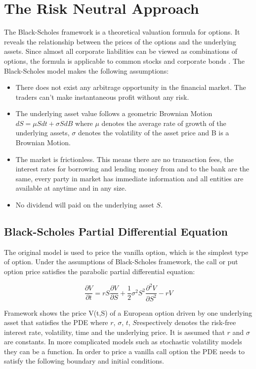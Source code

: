\documentclass[12pt, oneside]{book}
\theoremstyle{plain}
\theoremstyle{definition}
\begin{document}
\section{The Risk Neutral Approach}
The Black-Scholes framework is a theoretical valuation formula for options. It reveals the relationship between the prices of the options and the underlying assets. Since almost all corporate liabilities can be viewed as combinations of options, the formula is applicable to common stocks and corporate bonds \cite{BS}. The Black-Scholes model makes the following assumptions:
\begin{itemize}
\item There does not exist any arbitrage opportunity in the financial market.  The traders can’t make instantaneous profit without any risk.
\item The underlying asset value follows a geometric Brownian Motion $dS = \mu S dt + \sigma S dB $ where $\mu$ denotes the average rate of growth of the underlying assets, $\sigma$ denotes the volatility of the asset price and B is a Brownian Motion.
\item The market is frictionless.  This means there are no transaction fees, the interest rates for borrowing and lending money from and to the bank are the same, every party  in  market  has  immediate  information  and  all  entities  are  available  at  anytime and in any size.
\item No dividend will paid on the underlying asset $S$.
\end{itemize}

\subsection{Black-Scholes Partial Differential Equation}
The original model is used to price the vanilla  option, which is the simplest type of option.
Under the assumptions of Black-Scholes framework, the call or put option price satisfies the parabolic partial differential equation:

\begin{equation}
\frac{\partial V}{\partial t} = rS\frac{\partial V}{\partial S}+\frac{1}{2} \sigma^2 S^2 \frac{\partial^2 V}{\partial S^2} - rV
\end{equation}

Framework shows the  price V(t,S)  of  a  European  option  driven  by  one underlying asset that satisfies the PDE where $r$, $\sigma$, $t$, $S$respectively denotes the risk-free interest rate, volatility, time and the underlying price.  It is assumed that $r$ and $\sigma$ are constants. In more complicated models such as stochastic volatility models they can be a function. In order to price a vanilla call option the PDE needs to satisfy the following boundary and initial conditions.
\end{document}
